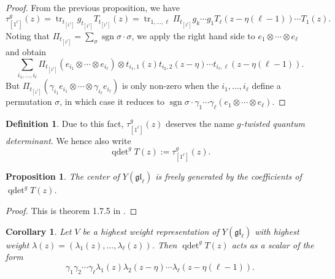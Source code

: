 \documentclass[11pt]{report}
\newtheorem{prop}[theorem]{Proposition}
\newtheorem{corollary}[theorem]{Corollary}
\theoremstyle{definition}
\newtheorem{definition}[theorem]{Definition}
\theoremstyle{remark}
\theoremstyle{remark}
\begin{document}
\begin{proof}
From the previous proposition, we have
\begin{equation*}
\tau_{[1^\ell]}^g(z) = \operatorname{tr}_{t_{[1^\ell]}} g_{t_{[1^\ell]}} T_{t_{[1^\ell]}}(z) = \operatorname{tr}_{1,...,\ell} \Pi_{t_{[1^\ell]}} g_k \cdots g_1 T_\ell(z-\eta(\ell-1)) \cdots T_1(z).
\end{equation*}
Noting that $\Pi_{t_{[1^\ell]}} = \sum_\sigma \operatorname{sgn} \sigma \cdot \sigma$, we apply the right hand side to $e_1 \otimes \cdots \otimes e_\ell$ and obtain
\begin{equation*}
\sum_{i_1,...,i_\ell} \Pi_{t_{[1^\ell]}} (e_{i_1} \otimes \cdots \otimes e_{i_\ell}) \otimes t_{i_1,1}(z) t_{i_2,2}(z-\eta) \cdots t_{i_\ell,\ell}(z-\eta(\ell-1)).
\end{equation*}
But $\Pi_{t_{[1^\ell]}} (\gamma_{i_1} e_{i_1} \otimes \cdots \otimes \gamma_{i_\ell} e_{i_\ell})$ is only non-zero when the $i_1,...,i_\ell$ define a permutation $\sigma$, in which case it reduces to $\operatorname{sgn} \sigma \cdot \gamma_1 \cdots \gamma_\ell (e_1 \otimes \cdots \otimes e_\ell)$.
\end{proof}

\begin{definition}
Due to this fact, $\tau_{[1^\ell]}^g(z)$ deserves the name \emph{$g$-twisted quantum determinant}. We hence also write 
\begin{equation*}
\operatorname{qdet}^g T(z) := \tau_{[1^\ell]}^g(z).
\end{equation*}
\end{definition}

\begin{prop}
The center of $Y(\mathfrak{gl}_\ell)$ is freely generated by the coefficients of $\operatorname{qdet}^g T(z)$.
\end{prop}

\begin{proof}
This is theorem 1.7.5 in \cite{book:molev}.
\end{proof}

\begin{corollary}\label{corollary:quantumDet}
Let $V$ be a highest weight representation of $Y(\mathfrak{gl}_\ell)$ with highest weight $\lambda(z) = (\lambda_1(z),...,\lambda_\ell(z))$. Then $\operatorname{qdet}^g T(z)$ acts as a scalar of the form
\begin{equation*}
\gamma_1 \gamma_2 \cdots \gamma_\ell \lambda_1(z) \lambda_2(z-\eta) \cdots \lambda_\ell(z-\eta(\ell-1)).
\end{equation*}
\end{corollary}
\end{document}
